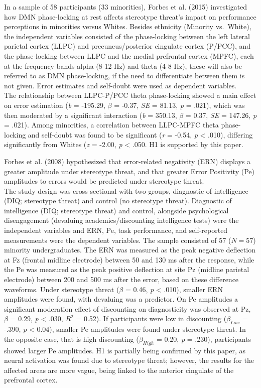 \documentclass[
  stu, a4paper,floatsintext]{apa7}
\begin{document}
In a sample of 58 participants (33 minorities), Forbes et al. (2015) investigated how DMN phase-locking at rest affects stereotype threat's impact on performance perceptions in minorities versus Whites.
Besides ethnicity (Minority vs.~White), the independent variables consisted of the phase-locking between the left lateral parietal cortex (LLPC) and precuneus/posterior cingulate cortex (P/PCC), and the phase-locking between LLPC and the medial prefrontal cortex (MPFC), each at the frequency bands alpha (8-12 Hz) and theta (4-8 Hz), these will also be referred to as DMN phase-locking, if the need to differentiate between them is not given.
Error estimates and self-doubt were used as dependent variables.\\
The relationship between LLPC-P/PCC theta phase-locking showed a main effect on error estimation (\emph{b} = -195.29, \(\beta\) = -0.37, \emph{SE} = 81.13, \emph{p} = .021), which was then moderated by a significant interaction (\emph{b} = 350.13, \(\beta\) = 0.37, \emph{SE} = 147.26, \emph{p} = .021).
Among minorities, a correlation between LLPC-MPFC theta phase-locking and self-doubt was found to be significant (\emph{r} = -0.54, \emph{p} \textless{} .010), differing significantly from Whites (\emph{z} = -2.00, \emph{p} \textless{} .050.
H1 is supported by this paper.

Forbes et al. (2008) hypothesized that error-related negativity (ERN) displays a greater amplitude under stereotype threat, and that greater Error Positivity (Pe) amplitudes to errors would be predicted under stereotype threat.\\
The study design was cross-sectional with two groups, diagnostic of intelligence (DIQ; stereotype threat) and control (no stereotype threat).
Diagnostic of intelligence (DIQ; stereotype threat) and control, alongside psychological disengagement (devaluing academics/discounting intelligence tests) were the independent variables and ERN, Pe, task performance, and self-reported measurements were the dependent variables.
The sample consisted of 57 (\(N = 57\)) minority undergraduates.
The ERN was measured as the peak negative deflection at Fz (frontal midline electrode) between 50 and 130 ms after the response, while the Pe was measured as the peak positive deflection at site Pz (midline parietal electrode) between 200 and 500 ms after the error, based on these difference waveforms.
Under stereotype threat (\(\beta\) = 0.46, \emph{p} \textless{} .010), smaller ERN amplitudes were found, with devaluing was a predictor.
On Pe amplitudes a significant moderation effect of discounting on diagnosticity was observed at Pz, \(\beta\) = 0.29, \emph{p} \textless{} .030, \(R^2\) = 0.52).
If participants were low in discounting (\(\beta_{Low}\) = -.390, \emph{p} \textless{} 0.04), smaller Pe amplitudes were found under stereotype threat.
In the opposite case, that is high discounting (\(\beta_{High}\) = 0.20, \emph{p} = .230), participants showed larger Pe amplitudes.
H1 is partially being confirmed by this paper, as neural activation was found due to stereotype threat; however, the results for the affected areas are more vague, being linked to the anterior cingulate of the prefrontal cortex.
\end{document}
